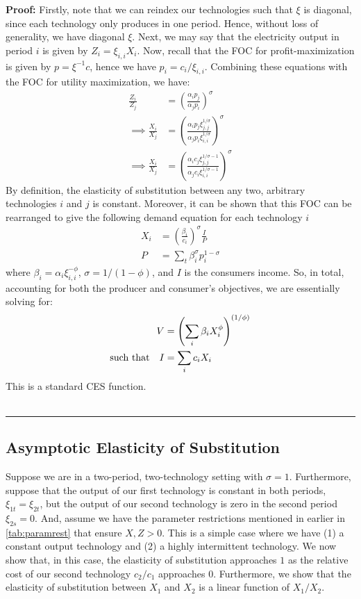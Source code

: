 \documentclass[11pt,a4paper,leqno]{extarticle}
\newenvironment{proof}[1][Proof]{\noindent\textbf{#1:} }{\ \rule{0.5em}{0.5em}}
\begin{document}
	\begin{proof}
		Firstly, note that we can reindex our technologies such that $\xi$ is diagonal, since each technology only produces in one period. Hence, without loss of generality, we have diagonal $\xi$. Next, we may say that the electricity output in period $i$ is given by $Z_i = \xi_{i,i} X_i$. Now, recall that the FOC for profit-maximization is given by $p = \xi^{-1} c$, hence we have $p_i = c_i / \xi_{i,i}$.  Combining these equations with the FOC for utility maximization, we have:
		\begin{align*}
		\frac{Z_i}{Z_j} &= \left( \frac{\alpha_i p_j}{\alpha_j p_i} \right)^\sigma \\
		\implies \frac{ X_i }{X_j} &= \left( \frac{ \alpha_i p_j \xi_{j,j}^{1/\sigma} }{ \alpha_j p_i \xi_{i,i}^{1/\sigma} } \right)^\sigma \\
		\implies \frac{ X_i }{X_j} &= \left( \frac{ \alpha_i c_j \xi_{j,j}^{1/\sigma - 1} }{ \alpha_j c_i \xi_{i,i}^{1/\sigma - 1} } \right)^\sigma
		\end{align*}
		By definition, the elasticity of substitution between any two, arbitrary technologies $i$ and $j$ is constant. Moreover, it can be shown that this FOC can be rearranged to give the following demand equation for each technology $i$
		\begin{align}
		X_i &= \left(\frac{\beta_i}{c_i} \right)^\sigma \frac{I}{P} \\
		P &= \sum_t \beta_i^\sigma p_i^{1-\sigma}
		\end{align}
		where $\beta_i = \alpha_i \xi_{i,i}^{-\phi}$, $\sigma = 1 / (1-\phi)$, and $I$ is the consumers income.	So, in total, accounting for both the producer and consumer's objectives, we are essentially solving for: 
		\begin{align*} 
		V &= \left( \sum_i \beta_i X_i^\phi \right)^{(1/\phi)}  \\
		\text{such that\quad} I &= \sum_i c_i X_i 
		\end{align*}
		This is a standard CES function.
		\\ \hfill
	\end{proof}
	
	\subsection{Asymptotic Elasticity of Substitution}
	
	\label{sec:asympeos}
	
	Suppose we are in a two-period, two-technology setting with $\sigma = 1$. Furthermore, suppose that the output of our first technology is constant in both periods, $\xi_{1t} = \xi_{2t}$, but the output of our second technology is zero in the second period $\xi_{2s} = 0$. And, assume we have the parameter restrictions mentioned in earlier in \autoref{tab:paramrest} that ensure $X, Z > 0$. This is a simple case where we have (1) a constant output technology and (2) a highly intermittent technology. We now show that, in this case, the elasticity of substitution approaches $1$ as the relative cost of our second technology $c_2/c_1$ approaches $0$. Furthermore, we show that the elasticity of substitution between $X_1$ and $X_2$ is a linear function of $X_1/X_2$.  
	
\end{document}
